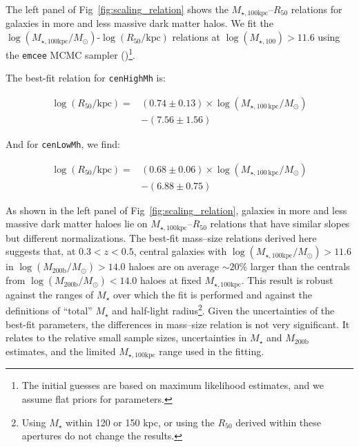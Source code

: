 \documentclass[a4paper,fleqn,usenatbib]{mnras}
\def\rbcg{\texttt{cenHighMh}}
\def\nbcg{\texttt{cenLowMh}}
\def\mstar{{$M_{\star}$}}
\def\mhalo{{$M_{\mathrm{200b}}$}}
\def\logmhalo{{$\log (M_{\mathrm{200b}}/M_{\odot})$}}
\def\mtot{{$M_{\star,100\mathrm{kpc}}$}}
\def\logmtot{{$\log (M_{\star,100\mathrm{kpc}}/M_{\odot})$}}
\begin{document}
    The left panel of Fig~\ref{fig:scaling_relation} shows the 
    \mtot{}--$R_{\mathrm{50}}$ relations for galaxies in more and less massive
    dark matter halos. 
    We fit the \logmtot{}-$\log (R_{\mathrm{50}}/\mathrm{kpc})$ relations at 
    $\log(M_{\star,100})>11.6$ using the \texttt{emcee} MCMC sampler 
    (\citealt{Emcee})\footnote{The initial guesses are based on maximum 
    likelihood estimates, and we assume flat priors for parameters.}.
    
    The best-fit relation for \rbcg{} is:
    
    \begin{equation}
        \begin{aligned}
        \log (R_{\mathrm{50}}/\mathrm{kpc}) = & (0.74\pm0.13) \times \log (M_{\star, 100\ \mathrm{kpc}}/M_{\odot}) \\ & -(7.56\pm1.56)
        \end{aligned}
    \end{equation}

    \noindent And for \nbcg{}, we find:
    
    \begin{equation}
        \begin{aligned}
        \log (R_{\mathrm{50}}/\mathrm{kpc}) = & (0.68\pm0.06) \times \log (M_{\star, 100\ \mathrm{kpc}}/M_{\odot}) \\ & -(6.88\pm0.75)
        \end{aligned}
    \end{equation}
    
    \noindent As shown in the left panel of Fig~\ref{fig:scaling_relation}, 
    galaxies in more and less massive dark matter haloes lie on 
    \mtot{}--$R_{\mathrm{50}}$ relations that have similar slopes but 
    different normalizations. 
    The best-fit mass--size relations derived here suggests that, 
    at $0.3 < z < 0.5$, central galaxies with \logmtot{}$>11.6$ in \logmhalo{}$>14.0$
    haloes are on average $\sim20$\% larger than the centrals from \logmhalo{}$<14.0$
    haloes at fixed \mtot{}.
    This result is robust against the ranges of \mstar{} over which the fit is 
    performed and against the definitions of  ``total'' \mstar{} and half-light 
    radius\footnote{Using \mstar{} within 120 or 150 kpc, or using the 
    $R_{\mathrm{50}}$ derived within these apertures do not change the results.}. 
    Given the uncertainties of the best-fit parameters, the differences in 
    mass--size relation is not very significant.  
    It relates to the relative small sample sizes, uncertainties in \mstar{} and 
    \mhalo{} estimates, and the limited \mtot{} range used in the fitting. 
    
\end{document}
